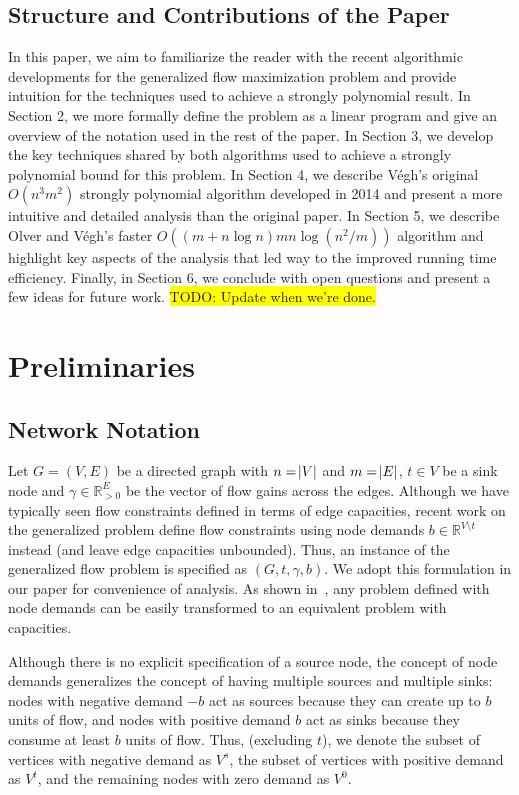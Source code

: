 \documentclass[11pt]{article}
\theoremstyle{definition}
\theoremstyle{definition}
\newcommand{\R}{\mathbb{R}}
\newcommand{\vsrc}{V^{s}}
\newcommand{\vsink}{V^{t}}
\newcommand{\vz}{V^{0}}
\newcommand{\todo}[1]{\colorbox{yellow}{TODO: #1}}
\begin{document}
	\subsection{Structure and Contributions of the Paper} In this paper, we aim to familiarize the reader with the recent algorithmic developments for the generalized flow maximization problem and provide intuition for the techniques used to achieve a strongly polynomial result. In Section 2, we more formally define the problem as a linear program and give an overview of the notation used in the rest of the paper. In Section 3, we develop the key techniques shared by both algorithms used to achieve a strongly polynomial bound for this problem. In Section 4, we describe Végh's original $O(n^3m^2)$ strongly polynomial algorithm developed in 2014 and present a more intuitive and detailed analysis than the original paper. In Section 5, we describe Olver and Végh's faster $O((m + n\log n)mn\log(n^2 / m))$ algorithm and highlight key aspects of the analysis that led way to the improved running time efficiency. Finally, in Section 6, we conclude with open questions and present a few ideas for future work. \todo{Update when we're done.}
    
\section{Preliminaries}

	\subsection{Network Notation}

	Let $G=(V,E)$ be a directed graph with $n=\abs{V}$ and $m=\abs{E}$,
	$t \in V$ be a sink node and $\gamma \in \R_{>0}^E$ be the vector of flow gains
	across the edges. Although we have typically seen flow constraints defined in terms of
	edge capacities, recent work on the generalized problem define flow
	constraints using node demands $b \in \R^{V \setminus t}$ instead (and leave
	edge capacities unbounded). Thus, an instance of the generalized flow problem
	is specified as $(G, t, \gamma, b)$.
	We adopt this formulation in our paper for
	convenience of analysis. As shown in~\cite{Vegh2013}, any problem defined with
	node demands can be easily transformed to an equivalent problem with
	capacities. 

	Although there is no explicit specification of a source node, the concept of
	node demands generalizes the concept of having multiple sources and multiple
	sinks: nodes with negative demand $-b$ act as sources because they can create
	up to $b$ units of flow, and nodes with positive demand $b$ act as sinks 
	because they consume at least $b$ units of flow. Thus, (excluding $t$), we denote the subset of
	vertices with negative demand as $\vsrc$, the subset of vertices with positive
	demand as $\vsink$, and the remaining nodes with zero demand as $\vz$.
\end{document}
